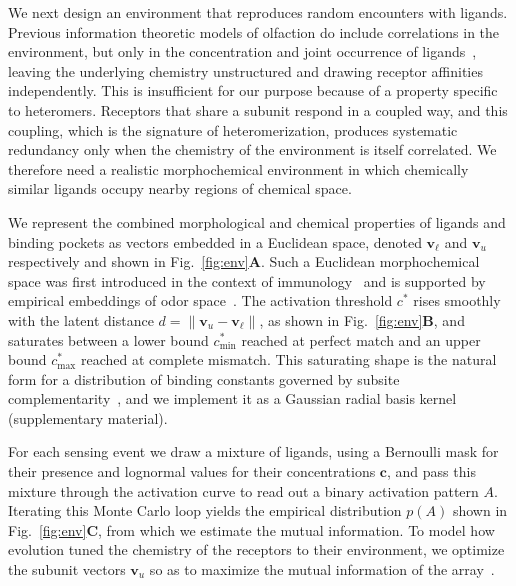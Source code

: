 \documentclass[aps,pre,twocolumn,superscriptaddress,floatfix,longbibliography]{revtex4-2}
\begin{document}
We next design an environment that reproduces random encounters with ligands.
Previous information theoretic models of olfaction do include correlations in
the environment, but only in the concentration and joint occurrence of
ligands~\cite{zwicker_receptor_2016, tesileanu_adaptation_2019}, leaving the
underlying chemistry unstructured and drawing receptor affinities
independently. This is insufficient for our purpose because of a property
specific to heteromers. Receptors that share a subunit respond in a coupled
way, and this coupling, which is the signature of heteromerization, produces
systematic redundancy only when the chemistry of the environment is itself
correlated. We therefore need a realistic morphochemical environment in which
chemically similar ligands occupy nearby regions of chemical space.

We represent the combined morphological and chemical properties of ligands and
binding pockets as vectors embedded in a Euclidean space, denoted
$\mathbf{v}_\ell$ and $\mathbf{v}_u$ respectively and shown in
Fig.~\ref{fig:env}\textbf{A}. Such a Euclidean morphochemical space was first
introduced in the context of immunology~\cite{perelson_theoretical_1979} and
is supported by empirical embeddings of odor space~\cite{lee_principal_2023,
wu_learning_2018}. The activation threshold $c^*$ rises smoothly with the
latent distance $d = \|\mathbf{v}_u - \mathbf{v}_\ell\|$, as shown in
Fig.~\ref{fig:env}\textbf{B}, and saturates between a lower bound
$c^*_\text{min}$ reached at perfect match and an upper bound $c^*_\text{max}$
reached at complete mismatch. This saturating shape is the natural form for a
distribution of binding constants governed by subsite
complementarity~\cite{lancet_probability_1993}, and we implement it as a
Gaussian radial basis kernel (supplementary material).

For each sensing event we draw a mixture of ligands, using a Bernoulli mask
for their presence and lognormal values for their concentrations $\mathbf{c}$,
and pass this mixture through the activation curve to read out a binary
activation pattern $A$. Iterating this Monte Carlo loop yields the empirical
distribution $p(A)$ shown in Fig.~\ref{fig:env}\textbf{C}, from which we
estimate the mutual information. To model how evolution tuned the chemistry of
the receptors to their environment, we optimize the subunit vectors
$\mathbf{v}_u$ so as to maximize the mutual information of the
array~\cite{tesileanu_adaptation_2019, zwicker_receptor_2016}.
\end{document}
